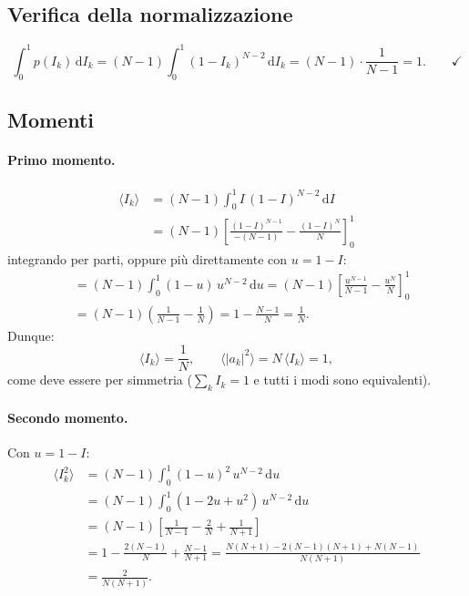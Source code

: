 \documentclass[a4paper,11pt]{article}
\newcommand{\de}{\mathrm{d}}
\begin{document}
\subsection{Verifica della normalizzazione}

\begin{equation}
  \int_0^1 p(I_k)\,\de I_k
  = (N-1) \int_0^1 (1 - I_k)^{N-2}\,\de I_k
  = (N-1) \cdot \frac{1}{N-1} = 1 . \qquad \checkmark
\end{equation}

\subsection{Momenti}

\paragraph{Primo momento.}
\begin{align}
  \langle I_k \rangle
  &= (N-1) \int_0^1 I\,(1-I)^{N-2}\,\de I \nonumber\\[4pt]
  &= (N-1) \left[\frac{(1-I)^{N-1}}{-(N-1)}
     - \frac{(1-I)^{N}}{N}\right]_0^1
\end{align}
integrando per parti, oppure più direttamente con $u = 1-I$:
\begin{align}
  &= (N-1)\int_0^1 (1-u)\,u^{N-2}\,\de u
   = (N-1)\left[\frac{u^{N-1}}{N-1} - \frac{u^N}{N}\right]_0^1
   \nonumber\\[4pt]
  &= (N-1)\left(\frac{1}{N-1} - \frac{1}{N}\right)
   = 1 - \frac{N-1}{N} = \frac{1}{N} .
\end{align}
Dunque:
\begin{equation}
  \boxed{
  \langle I_k \rangle = \frac{1}{N} ,
  \qquad
  \langle |a_k|^2 \rangle = N\,\langle I_k \rangle = 1 ,
  }
\end{equation}
come deve essere per simmetria ($\sum_k I_k = 1$ e tutti i modi sono
equivalenti).

\paragraph{Secondo momento.}
Con $u = 1 - I$:
\begin{align}
  \langle I_k^2 \rangle
  &= (N-1)\int_0^1 (1-u)^2\,u^{N-2}\,\de u \nonumber\\[4pt]
  &= (N-1)\int_0^1 (1 - 2u + u^2)\,u^{N-2}\,\de u \nonumber\\[4pt]
  &= (N-1)\left[\frac{1}{N-1} - \frac{2}{N} + \frac{1}{N+1}\right]
   \nonumber\\[4pt]
  &= 1 - \frac{2(N-1)}{N} + \frac{N-1}{N+1}
   = \frac{N(N+1) - 2(N-1)(N+1) + N(N-1)}{N(N+1)} \nonumber\\[4pt]
  &= \frac{2}{N(N+1)} .
\end{align}
\end{document}

